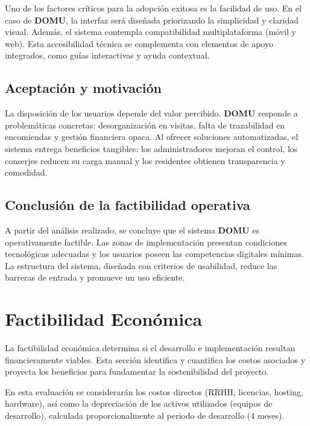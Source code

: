 Uno de los factores críticos para la adopción exitosa es la facilidad de uso. En el caso de \textbf{DOMU}, la interfaz será diseñada priorizando la simplicidad y claridad visual. Además, el sistema contempla compatibilidad multiplataforma (móvil y web). Esta accesibilidad técnica se complementa con elementos de apoyo integrados, como guías interactivas y ayuda contextual.

\subsection{Aceptación y motivación}

La disposición de los usuarios depende del valor percibido. \textbf{DOMU} responde a problemáticas concretas: desorganización en visitas, falta de trazabilidad en encomiendas y gestión financiera opaca. Al ofrecer soluciones automatizadas, el sistema entrega beneficios tangibles: los administradores mejoran el control, los conserjes reducen su carga manual y los residentes obtienen transparencia y comodidad.

\subsection*{Conclusión de la factibilidad operativa}

A partir del análisis realizado, se concluye que el sistema \textbf{DOMU} es operativamente factible. Las zonas de implementación presentan condiciones tecnológicas adecuadas y los usuarios poseen las competencias digitales mínimas. La estructura del sistema, diseñada con criterios de usabilidad, reduce las barreras de entrada y promueve un uso eficiente.

\section{Factibilidad Económica}

La factibilidad económica determina si el desarrollo e implementación resultan financieramente viables. Esta sección identifica y cuantifica los costos asociados y proyecta los beneficios para fundamentar la sostenibilidad del proyecto.

En esta evaluación se considerarán los costos directos (RRHH, licencias, hosting, hardware), así como la depreciación de los activos utilizados (equipos de desarrollo), calculada proporcionalmente al periodo de desarrollo (4 meses).

